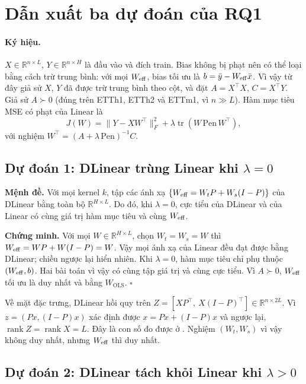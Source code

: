 \section{Dẫn xuất ba dự đoán của RQ1}
\label{app:derivation}

\paragraph{Ký hiệu.} $X \in \mathbb{R}^{n \times L}$, $Y \in \mathbb{R}^{n \times H}$ là đầu vào và đích train. Bias không bị phạt nên có thể loại bằng cách trừ trung bình: với mọi $W_{\mathrm{eff}}$, bias tối ưu là $b = \bar y - W_{\mathrm{eff}} \bar x$. Vì vậy từ đây giả sử $X$, $Y$ đã được trừ trung bình theo cột, và đặt $A = X^\top X$, $C = X^\top Y$. Giả sử $A \succ 0$ (đúng trên ETTh1, ETTh2 và ETTm1, vì $n \gg L$). Hàm mục tiêu MSE có phạt của Linear là
\begin{equation}
    J(W) = \|Y - X W^\top\|_F^2 + \lambda \operatorname{tr}(W\, \mathrm{Pen}\, W^\top),
\end{equation}
với nghiệm $W^\top = (A + \lambda\, \mathrm{Pen})^{-1} C$.

\subsection{Dự đoán 1: DLinear trùng Linear khi \texorpdfstring{$\lambda = 0$}{lambda = 0}}

\textbf{Mệnh đề.} Với mọi kernel $k$, tập các ánh xạ $\{W_{\mathrm{eff}} = W_t P + W_s (I - P)\}$ của DLinear bằng toàn bộ $\mathbb{R}^{H \times L}$. Do đó, khi $\lambda = 0$, cực tiểu của DLinear và của Linear có cùng giá trị hàm mục tiêu và cùng $W_{\mathrm{eff}}$.

\textbf{Chứng minh.} Với mọi $W \in \mathbb{R}^{H \times L}$, chọn $W_t = W_s = W$ thì $W_{\mathrm{eff}} = WP + W(I - P) = W$. Vậy mọi ánh xạ của Linear đều đạt được bằng DLinear; chiều ngược lại hiển nhiên. Khi $\lambda = 0$, hàm mục tiêu chỉ phụ thuộc $(W_{\mathrm{eff}}, b)$. Hai bài toán vì vậy có cùng tập giá trị và cùng cực tiểu. Vì $A \succ 0$, $W_{\mathrm{eff}}$ tối ưu là duy nhất và bằng $W_{\mathrm{OLS}}$. \hfill$\square$

Về mặt đặc trưng, DLinear hồi quy trên $Z = [X P^\top,\ X (I - P)^\top] \in \mathbb{R}^{n \times 2L}$. Vì $z = (Px, (I-P)x)$ xác định được $x = Px + (I-P)x$ và ngược lại, $\operatorname{rank} Z = \operatorname{rank} X = L$. Đây là con số đo được ở . Nghiệm $(W_t, W_s)$ vì vậy không duy nhất, nhưng $W_{\mathrm{eff}}$ thì duy nhất.

\subsection{Dự đoán 2: DLinear tách khỏi Linear khi \texorpdfstring{$\lambda > 0$}{lambda > 0}}

